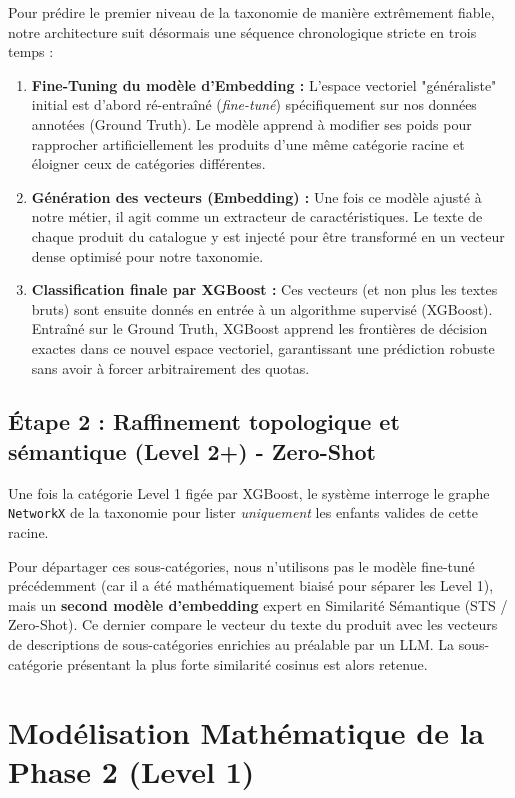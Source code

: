 \documentclass[11pt,a4paper]{article}
\begin{document}
Pour prédire le premier niveau de la taxonomie de manière extrêmement fiable, notre architecture suit désormais une séquence chronologique stricte en trois temps :

\begin{enumerate}
    \item \textbf{Fine-Tuning du modèle d'Embedding :} L'espace vectoriel "généraliste" initial est d'abord ré-entraîné (\textit{fine-tuné}) spécifiquement sur nos données annotées (Ground Truth). Le modèle apprend à modifier ses poids pour rapprocher artificiellement les produits d'une même catégorie racine et éloigner ceux de catégories différentes.
    \item \textbf{Génération des vecteurs (Embedding) :} Une fois ce modèle ajusté à notre métier, il agit comme un extracteur de caractéristiques. Le texte de chaque produit du catalogue y est injecté pour être transformé en un vecteur dense optimisé pour notre taxonomie.
    \item \textbf{Classification finale par XGBoost :} Ces vecteurs (et non plus les textes bruts) sont ensuite donnés en entrée à un algorithme supervisé (XGBoost). Entraîné sur le Ground Truth, XGBoost apprend les frontières de décision exactes dans ce nouvel espace vectoriel, garantissant une prédiction robuste sans avoir à forcer arbitrairement des quotas.
\end{enumerate}

\subsection{Étape 2 : Raffinement topologique et sémantique (Level 2+) - Zero-Shot}

Une fois la catégorie Level 1 figée par XGBoost, le système interroge le graphe \texttt{NetworkX} de la taxonomie pour lister \textit{uniquement} les enfants valides de cette racine. 

Pour départager ces sous-catégories, nous n'utilisons pas le modèle fine-tuné précédemment (car il a été mathématiquement biaisé pour séparer les Level 1), mais un \textbf{second modèle d'embedding} expert en Similarité Sémantique (STS / Zero-Shot). Ce dernier compare le vecteur du texte du produit avec les vecteurs de descriptions de sous-catégories enrichies au préalable par un LLM. La sous-catégorie présentant la plus forte similarité cosinus est alors retenue.
\section{Modélisation Mathématique de la Phase 2 (Level 1)}
\end{document}
